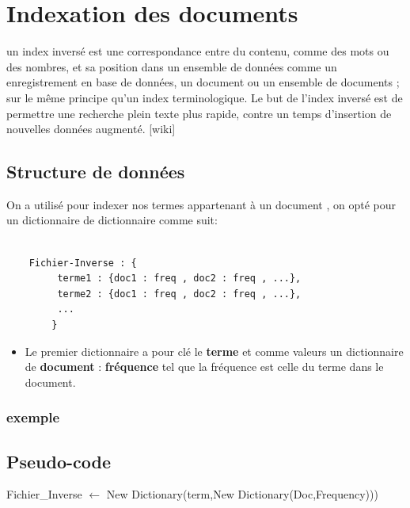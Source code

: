 \documentclass[12pt,a4paper,oneside]{article}
\begin{document}
\newpage

\section{Indexation des documents}
un index inversé est une correspondance entre du contenu, comme des mots ou des nombres, et sa position dans un ensemble de données comme un enregistrement en base de données, un document ou un ensemble de documents ; sur le même principe qu'un index terminologique. Le but de l'index inversé est de permettre une recherche plein texte plus rapide, contre un temps d'insertion de nouvelles données augmenté. [wiki]

\subsection{Structure de données}
On a utilisé pour indexer nos termes appartenant à un document , on opté pour un dictionnaire de dictionnaire comme suit:
\begin{lstlisting}

	Fichier-Inverse : {
		 terme1 : {doc1 : freq , doc2 : freq , ...},
		 terme2 : {doc1 : freq , doc2 : freq , ...},
		 ...
		}
\end{lstlisting}

\begin{itemize}
\item Le premier dictionnaire a  pour clé  le \textbf{terme} et comme valeurs un dictionnaire de \textbf{document} : \textbf{fréquence} tel que la fréquence est celle du terme dans le document.
\end{itemize}

\subsubsection*{exemple}

\subsection{Pseudo-code}


\begin{algorithm}[H]
                 	\DontPrintSemicolon


Fichier\_Inverse $ \gets$ New Dictionary(term,New Dictionary(Doc,Frequency)))
                 	
                 	
                 	
                 	\;
                 	\caption{{\sc  }}
                 	\label{algo:duplicate2}
\end{algorithm}
\end{document}
